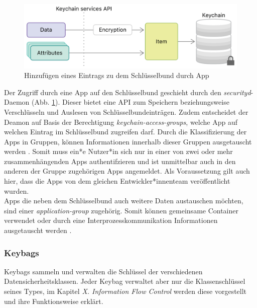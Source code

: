 \begin{figure}[h]
	\centering
  		\includegraphics[width=1\textwidth]{../images/keychain-api-example}
		\caption{Hinzufügen eines Eintrags zu dem Schlüsselbund durch App \cite{apple2020keychain_items}}
		\label{fig:add-entry-to-keychain}
\end{figure}

Der Zugriff durch eine App auf den Schlüsselbund geschieht durch den \textit{securityd}-Daemon (Abb. \ref{fig:add-entry-to-keychain}). Dieser bietet eine API zum Speichern beziehungsweise Verschlüsseln und Auslesen von Schlüsselbundeinträgen. Zudem  entscheidet der Deamon auf Basis der Berechtigung \textit{keychain-access-groups}, welche App auf welchen Eintrag im Schlüsselbund zugreifen darf. Durch die Klassifizierung der Apps in Gruppen, können Informationen innerhalb dieser Gruppen ausgetauscht werden \cite{apple2020keychain_item_groups}. Somit muss ein*e Nutzer*in sich nur in einer von zwei oder mehr zusammenhängenden Apps authentifzieren und ist unmittelbar auch in den anderen der Gruppe zugehörigen Apps angemeldet. Als Voraussetzung gilt auch hier, dass die Apps von dem gleichen Entwickler*innenteam veröffentlicht wurden. \\
Apps die neben dem Schlüsselbund auch weitere Daten austauschen möchten, sind einer \textit{application-group} zugehörig.  Somit können gemeinsame Container verwendet oder durch eine Interprozesskommunikation Informationen ausgetauscht werden \cite{apple2020keychain_application_groups}. 


\subsubsection{Keybags}
Keybags sammeln und verwalten die Schlüssel der verschiedenen Datensicherheitsklassen. Jeder Keybag verwaltet aber
nur die Klassenschlüssel seines Types, im Kapitel \textit{X. Information Flow Control} werden diese vorgestellt und ihre 
Funktionsweise erklärt.


